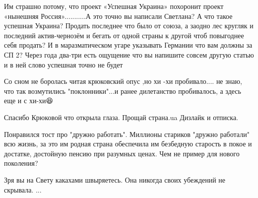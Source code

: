 \begin{itemize}
Им страшно потому, что проект «Успешная Украина» похоронит проект «нынешняя
Россия»...........А это точно вы написали Светлана? А что такое успешная
Украина? Продать последнее что было от союза, а заодно лес кругляк и последний
актив-чернозём и бегать от одной страны к другой чтоб повыгоднее себя продать? И
в маразматическом угаре указывать Германии что вам должны за СП 2? Через года
два-три есть ощущение что вы напишите совсем другую статью и в ней слово
успешная точно не будет


 

Со сном не боролась читая крюковский опус ,но хи -хи пробивало.... не знаю, что
так возмутились "поклонники"...и ранее дилетанство пробивалось, а здесь еще и с
хи-хи😆


 
Спасибо Крюковой что открыла глаза. Прощай страна.ua Дизлайк и отписка.

 

Понравился тост про "дружно работать". Миллионы стариков "дружно работали" всю
жизнь, за это им родная страна обеспечила им безбедную старость в покое и
достатке, достойную пенсию при разумных ценах. Чем не пример для нового
поколения?


 
Зря вы на Свету какахами швыряетесь. Она никогда своих убеждений не скрывала. ...

\begin{itemize}
 

\end{itemize}
\end{itemize}
